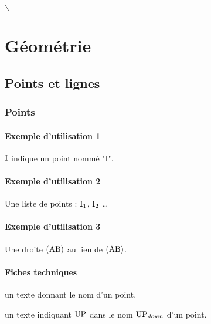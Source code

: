 \documentclass[12pt,a4paper]{article}
\begin{document}
$\smallsetminus$
\section{Géométrie}

    \subsection{Points et lignes}

	    \subsubsection{Points}

            \paragraph{Exemple d'utilisation 1}

\begin{tcblisting}{}
$\pt{I}$ indique un point nommé "I".
\end{tcblisting}


            \paragraph{Exemple d'utilisation 2}

\begin{tcblisting}{}
Une liste de points : $\pt*{I}{1}$, $\pt*{I}{2}$ \dots
\end{tcblisting}


            \paragraph{Exemple d'utilisation 3}

\begin{tcblisting}{}
Une droite $(\pts{AB})$ au lieu de $(\pt{A}\pt{B})$.
\end{tcblisting}


            \paragraph{Fiches techniques}


\IDarg{} un texte donnant le nom d'un point.


\bigskip



 un texte indiquant $\pt{UP}$ dans le nom $\pt*{UP}{down}$ d'un point.
\end{document}
